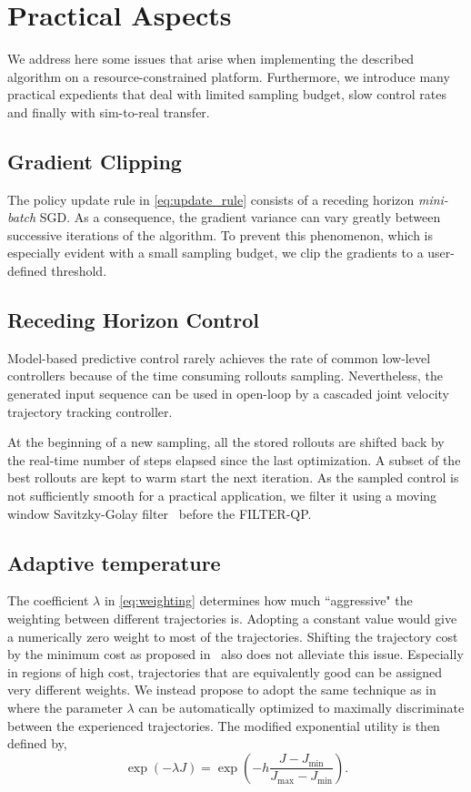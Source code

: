 \section{Practical Aspects} \label{sec:practical_aspects}

We address here some issues that arise when implementing the described algorithm on a resource-constrained platform. Furthermore, we introduce many practical expedients that deal with limited sampling budget, slow control rates and finally with sim-to-real transfer.  

\subsection{Gradient Clipping} 
The policy update rule in \eqref{eq:update_rule} consists of a receding horizon \emph{mini-batch} SGD. As a consequence, the gradient variance can vary greatly between successive iterations of the algorithm. To prevent this phenomenon, which is especially evident with a small sampling budget, we clip the gradients to a user-defined threshold.  

\subsection{Receding Horizon Control} 
Model-based predictive control rarely achieves the rate of common low-level controllers because of the time consuming rollouts sampling. Nevertheless, the generated input sequence can be used in open-loop by a cascaded joint velocity trajectory tracking controller. 

At the beginning of a new sampling, all the stored rollouts are shifted back by the real-time number of steps elapsed since the last optimization. A subset of the best rollouts are kept to warm start the next iteration. 
As the sampled control is not sufficiently smooth for a practical application, we filter it using a moving window Savitzky-Golay filter~\cite{gorry1990general} before the FILTER-QP. 

\subsection{Adaptive temperature} 
The coefficient $\lambda$ in \eqref{eq:weighting} determines how much ``aggressive" the weighting between different trajectories is. Adopting a constant value would give a numerically zero weight to most of the trajectories. Shifting the trajectory cost by the minimum cost as proposed in~\cite{williams_information_2017} also does not alleviate this issue. 
Especially in regions of high cost, trajectories that are equivalently good can be assigned very different weights. We instead propose to adopt the same technique as in~\cite{theodorou2010generalized} where the parameter $\lambda$ can be automatically optimized to maximally discriminate between the experienced trajectories. The modified exponential utility is then defined by,
\begin{equation} \label{eq:adaptive_t}
    \exp (-\lambda J ) = \exp \left( -h \frac{J - J_{\min}}{J_{\max} - J_{\min}} \right).
\end{equation}

